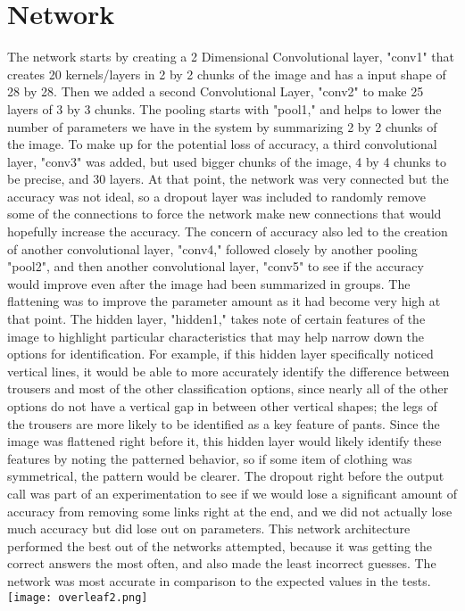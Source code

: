 \documentclass[11pt]{article}
\begin{document}
\section{Network}
The network starts by creating a 2 Dimensional Convolutional layer, "conv1" that creates 20 kernels/layers in 2 by 2 chunks of the image and has a input shape of 28 by 28. Then we added a second Convolutional Layer, "conv2" to make 25 layers of 3 by 3 chunks. The pooling starts with "pool1," and helps to lower the number of parameters we have in the system by summarizing 2 by 2 chunks of the image. To make up for the potential loss of accuracy, a third convolutional layer, "conv3" was added, but used bigger chunks of the image, 4 by 4 chunks to be precise, and 30 layers. At that point, the network was very connected but the accuracy was not ideal, so a dropout layer was included to randomly remove some of the connections to force the network make new connections that would hopefully increase the accuracy. The concern of accuracy also led to the creation of another convolutional layer, "conv4," followed closely by another pooling "pool2", and then another convolutional layer, "conv5" to see if the accuracy would improve even after the image had been summarized in groups. The flattening was to improve the parameter amount as it had become very high at that point. The hidden layer, "hidden1," takes note of certain features of the image to highlight particular characteristics that may help narrow down the options for identification. For example, if this hidden layer specifically noticed vertical lines, it would be able to more accurately identify the difference between trousers and most of the other classification options, since nearly all of the other options do not have a vertical gap in between other vertical shapes; the legs of the trousers are more likely to be identified as a key feature of pants. Since the image was flattened right before it, this hidden layer would likely identify these features by noting the patterned behavior, so if some item of clothing was symmetrical, the pattern would be clearer. The dropout right before the output call was part of an experimentation to see if we would lose a significant amount of accuracy from removing some links right at the end, and we did not actually lose much accuracy but did lose out on parameters. This network architecture performed the best out of the networks attempted, because it was getting the correct answers the most often, and also made the least incorrect guesses. The network was most accurate in comparison to the expected values in the tests.
\\
\texttt{[image: overleaf2.png]}
\end{document}
